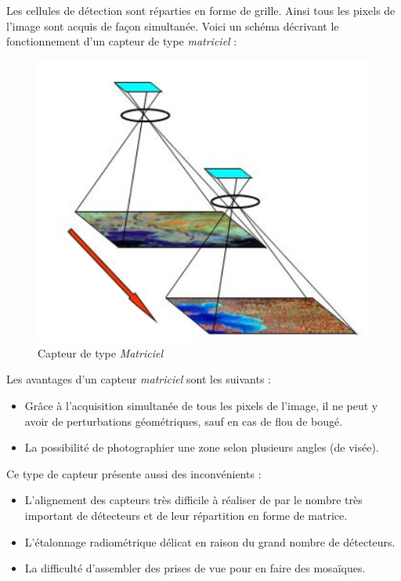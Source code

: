 \documentclass[a4paper, 11pt]{report}
\begin{document}
Les cellules de détection sont réparties en forme de grille. Ainsi tous les pixels de l'image sont acquis de façon simultanée.
Voici un schéma décrivant le fonctionnement d'un capteur de type \emph{matriciel} :
\begin{figure}[H]
	\centering
	\includegraphics[scale=0.7]{Images/CCD_Sensor.png}
	\caption{Capteur de type \emph{Matriciel}}
\end{figure}

Les avantages d'un capteur \emph{matriciel} sont les suivants :
\begin{itemize}
	\item Grâce à l'acquisition simultanée de tous les pixels de l'image, il ne peut y avoir de perturbations géométriques, sauf en cas de flou de bougé.
	\item La possibilité de photographier une zone selon plusieurs angles (de visée).
\end{itemize}
Ce type de capteur présente aussi des inconvénients :
\begin{itemize}
	\item L'alignement des capteurs très difficile à réaliser de par le nombre très important de détecteurs et de leur répartition en forme de matrice.
	\item L'étalonnage radiométrique délicat en raison du grand nombre de détecteurs.
	\item La difficulté d'assembler des prises de vue pour en faire des mosaïques.
\end{itemize}
\end{document}
